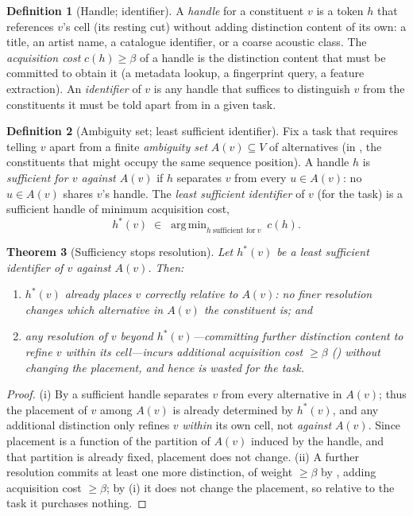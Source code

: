 \documentclass[11pt,twocolumn,a4paper]{article}
\theoremstyle{thmstyle}
\newtheorem{theorem}{Theorem}[section]
\theoremstyle{definition}
\newtheorem{definition}[theorem]{Definition}
\theoremstyle{remark}
\DeclareMathOperator*{\argmin}{arg\,min}
\newcommand{\V}{V}
\newcommand{\flo}{\beta}
\newcommand{\hand}{h}
\begin{document}
\begin{definition}[Handle; identifier]
\label{def:handle}
A \emph{handle} for a constituent $v$ is a token $\hand$ that references $v$'s
cell (its resting cut) without adding distinction content of its own: a title, an
artist name, a catalogue identifier, or a coarse acoustic class. The
\emph{acquisition cost} $c(\hand)\ge\flo$ of a handle is the distinction content
that must be committed to obtain it (a metadata lookup, a fingerprint query, a
feature extraction). An \emph{identifier} of $v$ is any handle that suffices to
distinguish $v$ from the constituents it must be told apart from in a given task.
\end{definition}

\begin{definition}[Ambiguity set; least sufficient identifier]
\label{def:lsi}
Fix a task that requires telling $v$ apart from a finite \emph{ambiguity set}
$A(v)\subseteq\V$ of alternatives (in , the constituents
that might occupy the same sequence position). A handle $\hand$ is
\emph{sufficient for $v$ against $A(v)$} if $\hand$ separates $v$ from every
$u\in A(v)$: no $u\in A(v)$ shares $v$'s handle. The \emph{least sufficient
identifier} of $v$ (for the task) is a sufficient handle of minimum acquisition
cost,
\[
\hand^{\ast}(v)\;\in\;\argmin_{\hand\ \text{sufficient for}\ v}\ c(\hand).
\]
\end{definition}

\begin{theorem}[Sufficiency stops resolution]
\label{thm:sufficiency}
Let $\hand^{\ast}(v)$ be a least sufficient identifier of $v$ against $A(v)$.
Then:
\begin{enumerate}[label=\textup{(\roman*)},leftmargin=2.2em]
\item $\hand^{\ast}(v)$ already places $v$ correctly relative to $A(v)$: no
finer resolution changes which alternative in $A(v)$ the constituent is; and
\item any resolution of $v$ beyond $\hand^{\ast}(v)$---committing further
distinction content to refine $v$ within its cell---incurs additional
acquisition cost $\ge\flo$ () without changing the placement,
and hence is wasted for the task.
\end{enumerate}
\end{theorem}

\begin{proof}
(i) By  a sufficient handle separates $v$ from every alternative in
$A(v)$; thus the placement of $v$ among $A(v)$ is already determined by
$\hand^{\ast}(v)$, and any additional distinction only refines $v$ \emph{within}
its own cell, not \emph{against} $A(v)$. Since placement is a function of the
partition of $A(v)$ induced by the handle, and that partition is already fixed,
placement does not change. (ii) A further resolution commits at least one more
distinction, of weight $\ge\flo$ by , adding acquisition cost
$\ge\flo$; by (i) it does not change the placement, so relative to the task it
purchases nothing.
\end{proof}
\end{document}
